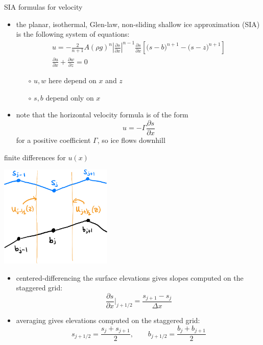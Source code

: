 \documentclass[10pt,dvipsnames]{beamer}
\begin{document}
\begin{frame}{SIA formulas for velocity}

\begin{itemize}
\item the planar, isothermal, Glen-law, non-sliding \alert{shallow ice approximation (SIA)} is the following system of equations:
\begin{gather*}
u = - \frac{2}{n+1} A (\rho g)^n \left|\frac{\partial s}{\partial x}\right|^{n-1} \frac{\partial s}{\partial x} \left[\big(s - b\big)^{n+1} - \big(s-z\big)^{n+1}\right] \\
\frac{\partial u}{\partial x} + \frac{\partial w}{\partial z} = 0
\end{gather*}

  \begin{itemize}
  \item[$\circ$] $u,w$ here depend on $x$ and $z$
  \item[$\circ$] $s,b$ depend only on $x$
  \end{itemize}

\item note that the horizontal velocity formula is of the form
	$$u = - \Gamma \frac{\partial s}{\partial x}$$
for a positive coefficient $\Gamma$, so \alert{ice flows downhill}
\end{itemize}
\end{frame}


\begin{frame}{finite differences for $u(x)$}

\begin{center}
\includegraphics[width=0.4\textwidth]{staggered}
\end{center}

\begin{itemize}
\item centered-differencing the surface elevations gives \alert{slopes computed on the staggered grid}:
    $$\frac{\partial s}{\partial x}\Big|_{j+1/2} = \frac{s_{j+1} - s_j}{\Delta x}$$
\item averaging gives \alert{elevations computed on the staggered grid}:
    $$s_{j+1/2} = \frac{s_j + s_{j+1}}{2}, \qquad b_{j+1/2} = \frac{b_j + b_{j+1}}{2}$$
\end{itemize}
\end{frame}
\end{document}
